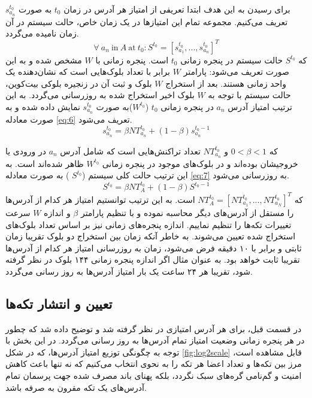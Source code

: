 برای رسیدن به این هدف ابتدا تعریفی از امتیاز هر آدرس در زمان $t_0$ به صورت 
$s_{a_n}^{t_0}$
تعریف می‌کنیم. مجموعه تمام این امتیاز‌ها در یک زمان خاص، حالت سیستم در آن زمان نامیده می‌گردد. 
\begin{equation}
\forall\ a_n\ \text{in}\  A\  \text{at}\  t_0: S^{t_0} = [s_{a_1}^{t_0}, ..., s_{a_n}^{t_0}]^T  
\label{eq:5}
\end{equation}
که
$S^{t_0}$
حالت سیستم در پنجره زمانی $t_0$ است. پنجره زمانی با $W$ مشخص شده و به این صورت تعریف می‌شود: پارامتر $W$ برابر با تعداد بلوک‌هایی است که نشان‌دهنده یک واحد زمانی هستند. بعد از استخراج $W$ بلوک و ثبت آن در زنجیره بلوکی بیت‌کوین، حالت سیستم با توجه به $W$ بلوک اخیر استخراج شده به روزرسانی می‌گردد. به این ترتیب امتیاز آدرس $a_n$ در پنجره زمانی  $t_0$  ($W^{t_0}$)به صورت $s_{a_n}^{t_0}$ نمایش داده شده و به صورت معادله \eqref{eq:6} تعریف می‌شود.
\begin{equation}
s_{a_n}^{t_0} = \beta NT_{a_n}^{t_0} + (1-\beta) s_{a_n}^{t_0-1}
\label{eq:6}
\end{equation}

که
$0<\beta<1$
و
$NT_{a_n}^{t_0}$
تعداد تراکنش‌هایی است که شامل آدرس $a_n$ در ورودی یا خروجیشان بوده‌اند و در بلوک‌های موجود در پنجره زمانی $W^{t_0}$ ظاهر شده‌اند است. به این ترتیب حالت کلی سیستم ($S^{t_0}$ ) به صورت معادله \eqref{eq:7} به روزرسانی می‌شود.
\begin{equation}
S^{t_0} = \beta NT_{A}^{t_0} + (1-\beta) S^{t_0-1}
\label{eq:7}
\end{equation}
که 
$NT_{A}^{t_0} = [NT_{a_1}^{t_0}, ..., NT_{a_N}^{t_0}]^T$
است. به این ترتیب توانستیم امتیاز هر کدام از آدرس‌ها را مستقل از آدرس‌های دیگر محاسبه نموده و با تنظیم پارامتر $\beta$ و اندازه $W$ سرعت تغییرات تکه‌ها را تنظیم نماییم. اندازه پنجره‌های زمانی نیز بر اساس تعداد بلوک‌های استخراج شده تعیین می‌شوند. به خاطر آنکه زمان بین استخراج دو بلوک تقریبا زمان ثابتی و برابر با ۱۰ دقیقه فرض می‌شود، زمان به روزرسانی امتیاز هر کدام از آدرس‌ها تقریبا ثابت خواهد بود. به عنوان مثال اگر اندازه پنجره زمانی ۱۴۴ بلوک در نظر گرفته شود، تقریبا هر ۲۴ ساعت یک بار امتیاز آدرس‌ها به روز رسانی می‌گردد.  


\subsection{تعیین و انتشار تکه‌ها}
\label{subsubsection:4.3.2}
در قسمت قبل، برای هر آدرس امتیازی در نظر گرفته شد و توضیح داده شد که چطور در هر پنجره زمانی وضعیت امتیاز تمام آدرس‌ها به روز رسانی می‌گردد. در این بخش با توجه به چگونگی توزیع امتیاز آدرس‌ها، که در شکل \ref{fig:log2scale} قابل مشاهده است، مرز بین تکه‌ها و تعداد اعضا هر تکه را به نحوی انتخاب می‌کنیم که نه تنها باعث کاهش امنیت و گم‌نامی گره‌های سبک نگردد، بلکه پهنای باند مصرف شده جهت پرسمان تمام آدرس‌های یک تکه مقرون به صرفه باشد.

